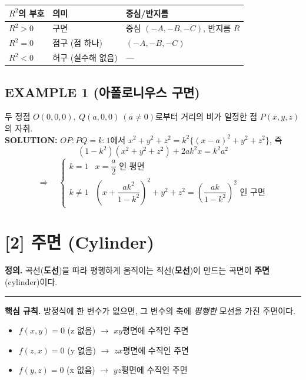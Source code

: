 \documentclass{article}
\theoremstyle{mystyle}
\begin{document}
\begin{center}
\renewcommand{\arraystretch}{1.3}
\begin{tabular}{|l|l|l|}
\hline
\(R^2\)의 부호 & 의미 & 중심/반지름 \\
\hline
\(R^2>0\) & 구면 & 중심 \((-A,-B,-C)\), 반지름 \(R\) \\
\hline
\(R^2=0\) & 점구 (점 하나) & \((-A,-B,-C)\) \\
\hline
\(R^2<0\) & 허구 (실수해 없음) & --- \\
\hline
\end{tabular}
\end{center}

\subsection*{EXAMPLE 1 (아폴로니우스 구면)}
두 정점 \(O(0,0,0),\ Q(a,0,0)\ (a\ne0)\)로부터 거리의 비가 일정한 점 \(P(x,y,z)\)의 자취.\\
\textbf{SOLUTION:} \(OP:PQ=k:1\)에서 \(x^2+y^2+z^2=k^2\{(x-a)^2+y^2+z^2\}\), 즉
\[
(1-k^2)(x^2+y^2+z^2)+2ak^2x=k^2a^2
\]
\[
\Rightarrow\quad
\begin{cases}
k=1 & x=\dfrac{a}{2}\text{ 인 평면}\\[6pt]
k\ne1 & \left(x+\dfrac{ak^2}{1-k^2}\right)^2+y^2+z^2=\left(\dfrac{ak}{1-k^2}\right)^2 \text{ 인 구면}
\end{cases}
\]

\section*{[2] 주면 (Cylinder)}

\begin{tcolorbox}[
    colback=teal!4,
    colframe=teal!65!black,
    title=정의 \& 핵심 규칙,
    fonttitle=\bfseries,
    boxrule=0.5mm,
    arc=3mm
    ]
    \textbf{\textcolor{teal!65!black}{정의.}}\quad
    곡선(\textbf{도선})을 따라 평행하게 움직이는 직선(\textbf{모선})이 만드는 곡면이 \textbf{주면}(cylinder)이다.

    \noindent\textcolor{teal!50!black}{\rule{\linewidth}{0.4pt}}

    \textbf{\textcolor{teal!65!black}{핵심 규칙.}}\quad
    방정식에 한 변수가 없으면, 그 변수의 축에 \emph{평행한} 모선을 가진 주면이다.
    \begin{itemize}
        \item \(f(x,y)=0\) (z 없음) $\to$ \(xy\)평면에 수직인 주면
        \item \(f(z,x)=0\) (y 없음) $\to$ \(zx\)평면에 수직인 주면
        \item \(f(y,z)=0\) (x 없음) $\to$ \(yz\)평면에 수직인 주면
    \end{itemize}
\end{tcolorbox}
\end{document}
